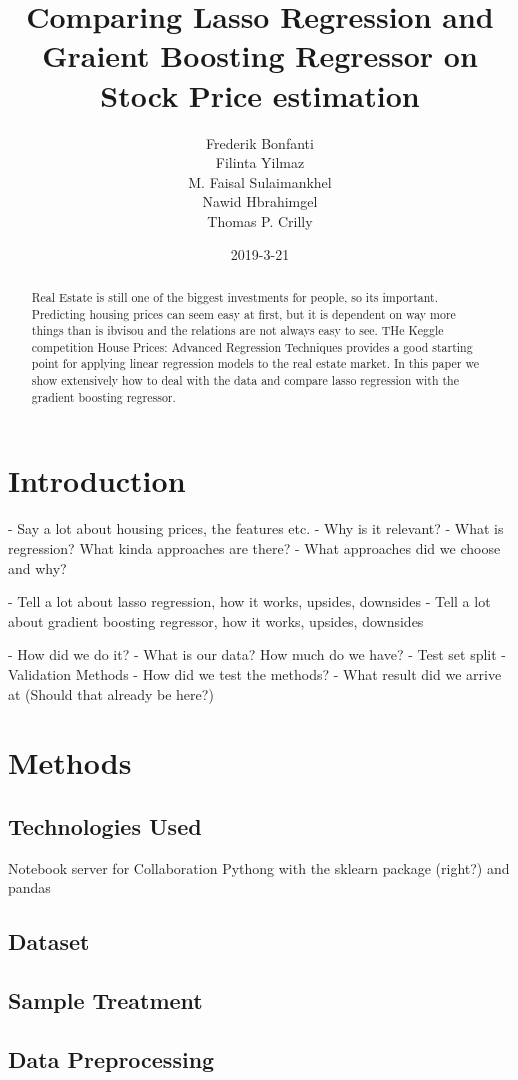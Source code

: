 \documentclass{article}
\title{Comparing Lasso Regression and Graient Boosting Regressor on Stock Price estimation}
\date{2019-3-21}
\author{Frederik Bonfanti \\ Filinta Yilmaz \\ M. Faisal Sulaimankhel \\ Nawid Hbrahimgel \\ Thomas P. Crilly}
\begin{document}
\maketitle

\begin{abstract}
Real Estate is still one of the biggest investments for people, so its important.
Predicting housing prices can seem easy at first, but it is dependent on way more things than is ibvisou and the relations are not always easy to see.
THe Keggle competition House Prices: Advanced Regression Techniques provides a good starting point for applying linear regression models to the real estate market.
In this paper we show extensively how to deal with the data and compare lasso regression with the gradient boosting regressor.
\end{abstract}

\section{Introduction}
 - Say a lot about housing prices, the features etc.
 - Why is it relevant?
 - What is regression? What kinda approaches are there?
 - What approaches did we choose and why?

   - Tell a lot about lasso regression, how it works, upsides, downsides
   - Tell a lot about gradient boosting regressor, how it works, upsides, downsides

 - How did we do it?
 - What is our data? How much do we have?
 - Test set split
 - Validation Methods
 - How did we test the methods?
 - What result did we arrive at (Should that already be here?)
\section{Methods}
\subsection{Technologies Used}
Notebook server for Collaboration
Pythong with the sklearn package (right?) and pandas
\subsection{Dataset} 
\subsection{Sample Treatment}
\subsection{Data Preprocessing}
\end{document}
